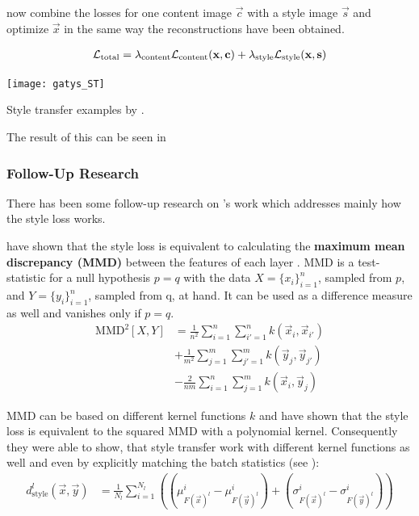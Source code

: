 \citeauthor*{gatys} now combine the losses for one content image $\vec{c}$ with a style image $\vec{s}$ and optimize $\vec{x}$ in the same way the reconstructions have been obtained.

\begin{align}
    \mathcal{L}_{\text{total}} = \lambda_{\text{content}} \mathcal{L}_{\text{content}}(\mathbf{x}, \mathbf{c}) + \lambda_{\text{style}} \mathcal{L}_{\text{style}}(\mathbf{x}, \mathbf{s})
\end{align}

\begin{marginfigure}
    \texttt{[image: gatys\_ST]}
    \caption[]{Style transfer examples by \citeauthor*{gatys}. \cite{gatys}}
\end{marginfigure}

The result of this can be seen in 

\subsubsection{Follow-Up Research}
There has been some follow-up research on \citeauthor*{gatys}'s work which addresses mainly how the style loss works.

\citeauthor*{MMD} have shown that the style loss is equivalent to calculating the \textbf{maximum mean discrepancy (MMD)} between the features of each layer \cite{MMD}.
MMD is a test-statistic for a null hypothesis $p=q$ with the data $X = \{x_i\}^n_{i=1}$, sampled from $p$, and $Y = \{y_i\}^n_{i=1}$, sampled from q, at hand.
It can be used as a difference measure as well and vanishes only if $p=q$.
\begin{align}
    \text{MMD}^2[X, Y] & = \frac{1}{n^2} \sum^n_{i=1} \sum^n_{i'=1} k(\vec{x}_i, \vec{x}_{i'}) \\
    & + \frac{1}{m^2} \sum^m_{j=1} \sum^m_{j'=1} k(\vec{y}_j, \vec{y}_{j'}) \\
    & - \frac{2}{nm} \sum^n_{i=1} \sum^m_{j=1} k(\vec{x}_i, \vec{y}_{j})
\end{align}

MMD can be based on different kernel functions $k$ and \citeauthor*{MMD} have shown that the style loss is equivalent to the squared MMD with a polynomial kernel.
Consequently they were able to show, that style transfer work with different kernel functions as well and even by explicitly matching the batch statistics (see ):
\begin{align}
    d_{\text{style}}^l(\vec{x}, \vec{y}) & = \frac{1}{N_l} \sum_{i = 1}^{N_l} \left( (\mu^i_{F(\vec{x})^l} - \mu^i_{F(\vec{y})^l}) + (\sigma^i_{F(\vec{x})^l} - \sigma^i_{F(\vec{y})^l}) \right)
\end{align}

